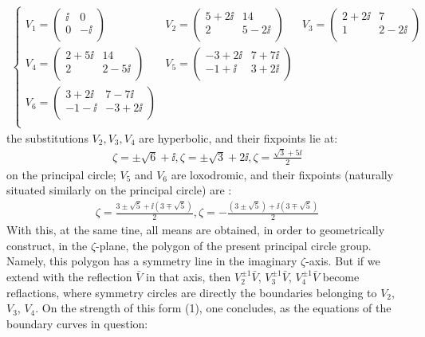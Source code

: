 \begin{align}
\left\{
\begin{array}{ccc}
V_1=\left(\begin{array}{cc}
\ii & 0\\
0 & -\ii\\
\end{array}\right) &
V_2=\left(\begin{array}{cc}
5+2\ii & 14\\
2 & 5-2\ii\\
\end{array}\right) & 
V_3=\left(\begin{array}{cc}
2+2\ii & 7\\
1 & 2-2\ii\\
\end{array}\right) \\
V_4=\left(\begin{array}{cc}
2+5\ii & 14\\
2 & 2-5\ii\\
\end{array}\right) & 
V_5=\left(\begin{array}{cc}
-3+2\ii & 7+7\ii\\
-1+\ii & 3+2\ii\\
\end{array}\right) & 
\\
V_6=\left(\begin{array}{cc}
3+2\ii & 7-7\ii\\
-1-\ii & -3+2\ii\\
\end{array}\right) & &\\
\end{array}
\right.
\end{align}
the substitutions $V_2,V_3,V_4$ are hyperbolic, and their fixpoints lie at:
\begin{align}
\zeta=\pm \sqrt{6}+\ii, \zeta=\pm\sqrt{3}+2\ii, \zeta=\frac{\sqrt{3}+5\ii}{2}
\end{align}
on the principal circle; $V_5$ and $V_6$ are loxodromic, and their fixpoints (naturally situated similarly on the principal circle) are :
\begin{align}
\zeta=\frac{3\pm\sqrt{5}+\ii(3\mp\sqrt{5})}{2}, \zeta=-\frac{(3\pm\sqrt{5})+\ii(3\mp\sqrt{5})}{2}
\end{align}
With this, at the same tine, all means are obtained, in order to geometrically construct, in the $\zeta$-plane, the polygon of the present principal circle group. Namely, this polygon has a symmetry line in the imaginary $\zeta$-axis. But if we extend with the reflection $\bar{V}$ in that axis, then $V^{\pm 1}_2\bar{V}$, $V^{\pm 1}_3\bar{V}$, $V^{\pm 1}_4\bar{V}$ become reflactions, where symmetry circles are directly the boundaries belonging to $V_2$, $V_3$, $V_4$. On the strength of this form (1), one concludes, as the equations of the boundary curves in question:
